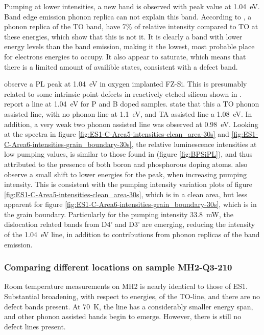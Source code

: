 Pumping at lower intensities, a new band is observed with peak value at 1.04~eV. Band edge emission phonon replica can not explain this band. According to \cite{dean67}, a phonon replica of the TO band, have 7\% of relative intensity compared to TO at these energies, which show that this is not it. It is clearly a band with lower energy levels than the band emission, making it the lowest, most probable place for electrons energies to occupy. It also appear to saturate, which means that there is a limited amount of availible states, consistent with a defect band.

\cite{misiuk99} observe a PL peak at 1.04~eV in oxygen implanted FZ-Si. This is presumably related to some intrinsic point defects in reactively etched silicon shown in \cite{erzgraber96}. \cite{enck69} report a line at 1.04~eV for P and B doped samples. \cite{enck69} state that this a TO phonon assisted line, with no phonon line at 1.1~eV, and TA assisted line a 1.08~eV. In addition, a very weak two phonon assisted line was observed at 0.98~eV. Looking at the spectra in figure \ref{fig:ES1-C-Area5-intensities-clean_area-30s} and \ref{fig:ES1-C-Area6-intensities-grain_boundary-30s}, the relative luminescence intensities at low pumping values, is similar to those found in \cite{enck69} (figure \ref{fig:BPSiPL}), and thus attributed to the presence of both boron and phosphorous doping atoms. \cite{enck69} also observe a small shift to lower energies for the peak, when increasing pumping intensity. This is consistent with the pumping intensity variation plots of figure \ref{fig:ES1-C-Area5-intensities-clean_area-30s}, which is in a clean area, but less apparent for figure \ref{fig:ES1-C-Area6-intensities-grain_boundary-30s}, which is in the grain boundary. Particularly for the pumping intensity 33.8~mW, the dislocation related bands from D4' and D3' are emerging, reducing the intensity of the 1.04~eV line, in addition to contributions from phonon replicas of the band emission.





\subsubsection{Comparing different locations on sample MH2-Q3-210}

Room temperature measurements on MH2 is nearly identical to those of ES1. Substantial broadening, with respect to energies, of the TO-line, and there are no defect bands present. At 70~K, the line has a considerably smaller energy span, and other phonon assisted bands begin to emerge. However, there is still no defect lines present.

